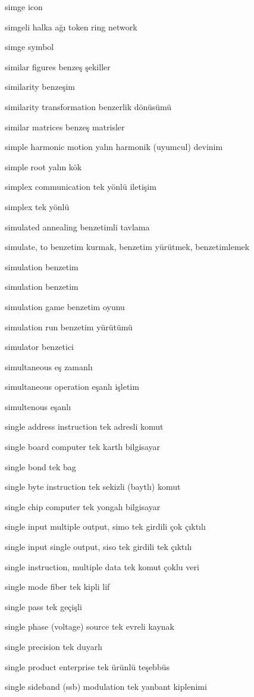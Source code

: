 \documentclass[12pt,fleqn]{article}\usepackage{../../common}
\begin{document}
simge icon

simgeli halka ağı token ring network

simge symbol

similar figures benzeş şekiller

similarity benzeşim

similarity transformation benzerlik dönüsümü

similar matrices benzeş matrisler

simple harmonic motion yalın harmonik (uyumcul) devinim

simple root yalın kök

simplex communication tek yönlü iletişim

simplex tek yönlü

simulated annealing benzetimli tavlama

simulate, to benzetim kurmak, benzetim yürütmek, benzetimlemek

simulation benzetim

simulation benzetim

simulation game benzetim oyunu

simulation run benzetim yürütümü

simulator benzetici

simultaneous eş zamanlı

simultaneous operation eşanlı işletim

simultenous eşanlı

single address instruction tek adresli komut

single board computer tek kartlı bilgisayar

single bond tek bag

single byte instruction tek sekizli (baytlı) komut

single chip computer tek yongalı bilgisayar

single input multiple output, simo tek girdili çok çıktılı

single input single output, siso tek girdili tek çıktılı

single instruction, multiple data tek komut çoklu veri

single mode fiber tek kipli lif

single pass tek geçişli

single phase (voltage) source tek evreli kaynak

single precision tek duyarlı

single product enterprise tek ürünlü teşebbüs

single sideband (ssb) modulation tek yanbant kiplenimi
\end{document}
